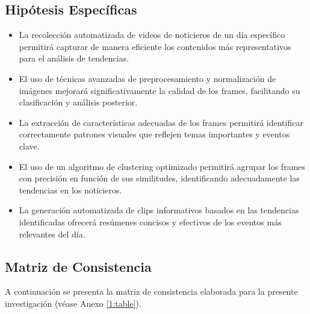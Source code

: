 \HipotesisGeneral
\subsection{Hipótesis Específicas}
\newcommand{\Hone}{
	La recolección automatizada de videos de noticieros de un día específico permitirá capturar de manera eficiente los contenidos más representativos para el análisis de tendencias.
}
\newcommand{\Htwo}{
	El uso de técnicas avanzadas de preprocesamiento y normalización de imágenes mejorará significativamente la calidad de los frames, facilitando su clasificación y análisis posterior.
}
\newcommand{\Hthree}{
	La extracción de características adecuadas de los frames permitirá identificar correctamente patrones visuales que reflejen temas importantes y eventos clave.
}
\newcommand{\Hfour}{
	El uso de un algoritmo de clustering optimizado permitirá agrupar los frames con precisión en función de sus similitudes, identificando adecuadamente las tendencias en los noticieros.
}
\newcommand{\Hfive}{
	La generación automatizada de clips informativos basados en las tendencias identificadas ofrecerá resúmenes concisos y efectivos de los eventos más relevantes del día.
}
\begin{itemize}
	\item \Hone
	\item \Htwo
	\item \Hthree
	\item \Hfour
	\item \Hfive
\end{itemize}

\subsection{Matriz de Consistencia}
A continuación se presenta la matriz de consistencia elaborada para la presente investigación (véase Anexo \ref{1:table}).

